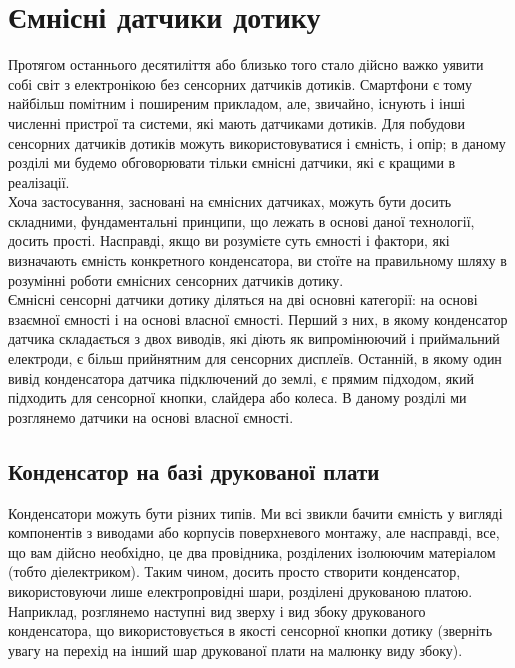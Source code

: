 \documentclass[a4paper,fontsize=12]{report}
\begin{document}
\tableofcontents
\setcounter{page}{2}
\newpage

\chapter{Ємнісні датчики дотику}
  Протягом останнього десятиліття або близько того стало дійсно важко уявити собі світ з електронікою без сенсорних датчиків дотиків. Смартфони є тому найбільш помітним і поширеним прикладом, але, звичайно, існують і інші численні пристрої та системи, які мають датчиками дотиків. Для побудови сенсорних датчиків дотиків можуть використовуватися і ємність, і опір; в даному розділі ми будемо обговорювати тільки ємнісні датчики, які є кращими в реалізації.\\

  Хоча застосування, засновані на ємнісних датчиках, можуть бути досить складними, фундаментальні принципи, що лежать в основі даної технології, досить прості. Насправді, якщо ви розумієте суть ємності і фактори, які визначають ємність конкретного конденсатора, ви стоїте на правильному шляху в розумінні роботи ємнісних сенсорних датчиків дотику.\\

  Ємнісні сенсорні датчики дотику діляться на дві основні категорії: на основі взаємної ємності і на основі власної ємності. Перший з них, в якому конденсатор датчика складається з двох виводів, які діють як випромінюючий і приймальний електроди, є більш прийнятним для сенсорних дисплеїв. Останній, в якому один вивід конденсатора датчика підключений до землі, є прямим підходом, який підходить для сенсорної кнопки, слайдера або колеса. В даному розділі ми розглянемо датчики на основі власної ємності.\\
\section{Конденсатор на базі друкованої плати}\par

  Конденсатори можуть бути різних типів. Ми всі звикли бачити ємність у вигляді компонентів з виводами або корпусів поверхневого монтажу, але насправді, все, що вам дійсно необхідно, це два провідника, розділених ізолюючим матеріалом (тобто діелектриком). Таким чином, досить просто створити конденсатор, використовуючи лише електропровідні шари, розділені друкованою платою. Наприклад, розглянемо наступні вид зверху і вид збоку друкованого конденсатора, що використовується в якості сенсорної кнопки дотику (зверніть увагу на перехід на інший шар друкованої плати на малюнку виду збоку).
\end{document}
